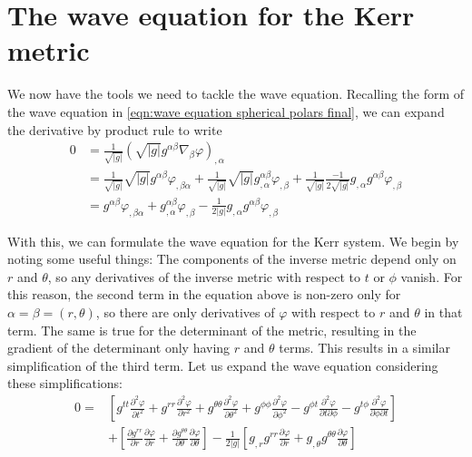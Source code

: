 \documentclass[11pt]{article}
\numberwithin{equation}{section}
\numberwithin{figure}{section}
\numberwithin{table}{section}
\begin{document}
\section{The wave equation for the Kerr metric}\label{sec:kerr metric wave equation}
\par We now have the tools we need to tackle the wave equation. Recalling the form of the wave equation in \cref{eqn:wave equation spherical polars final}, we can expand the derivative by product rule to write
\begin{align*}
    0&=\frac{1}{\sqrt{|g|}}(\sqrt{|g|}g^{\alpha\beta}\nabla_\beta\varphi)_{,\alpha}\\
    &=\frac{1}{\sqrt{|g|}}\sqrt{|g|}g^{\alpha\beta}\varphi_{,\beta\alpha}+\frac{1}{\sqrt{|g|}}\sqrt{|g|}g^{\alpha\beta}_{,\alpha}\varphi_{,\beta}+\frac{1}{\sqrt{|g|}}\frac{-1}{2\sqrt{|g|}}g_{,\alpha}g^{\alpha\beta}\varphi_{,\beta}\\
    &=g^{\alpha\beta}\varphi_{,\beta\alpha}+g^{\alpha\beta}_{,\alpha}\varphi_{,\beta}-\frac{1}{2|g|}g_{,\alpha}g^{\alpha\beta}\varphi_{,\beta}
\end{align*}
\par With this, we can formulate the wave equation for the Kerr system. We begin by noting some useful things: The components of the inverse metric depend only on $r$ and $\theta$, so any derivatives of the inverse metric with respect to $t$ or $\phi$ vanish. For this reason, the second term in the equation above is non-zero only for $\alpha=\beta=(r,\theta)$, so there are only derivatives of $\varphi$ with respect to $r$ and $\theta$ in that term. The same is true for the determinant of the metric, resulting in the gradient of the determinant only having $r$ and $\theta$ terms. This results in a similar simplification of the third term. Let us expand the wave equation considering these simplifications:
\begin{align*}
    0=&\left[g^{tt}\frac{\partial^2\varphi}{\partial t^2}+g^{rr}\frac{\partial^2\varphi}{\partial r^2}+g^{\theta\theta}\frac{\partial^2\varphi}{\partial\theta^2}+g^{\phi\phi}\frac{\partial^2\varphi}{\partial\phi^2}-g^{\phi t}\frac{\partial^2\varphi}{\partial t\partial\phi}-g^{t\phi}\frac{\partial^2\varphi}{\partial\phi\partial t}\right]\\&+\left[\frac{\partial g^{rr}}{\partial r}\frac{\partial\varphi}{\partial r}+\frac{\partial g^{\theta\theta}}{\partial \theta}\frac{\partial \varphi}{\partial \theta}\right]-\frac{1}{2|g|}\left[g_{,r}g^{rr}\frac{\partial\varphi}{\partial r}+g_{,\theta}g^{\theta\theta}\frac{\partial\varphi}{\partial\theta}\right]
\end{align*}
\end{document}
